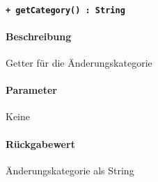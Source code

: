 \paragraph{\texttt{+ getCategory() : String}}\label{AP_ChangeAction_getCategory}%
\paragraph*{Beschreibung}
Getter für die Änderungskategorie
\paragraph*{Parameter}
Keine
\paragraph*{Rückgabewert}
Änderungskategorie als String